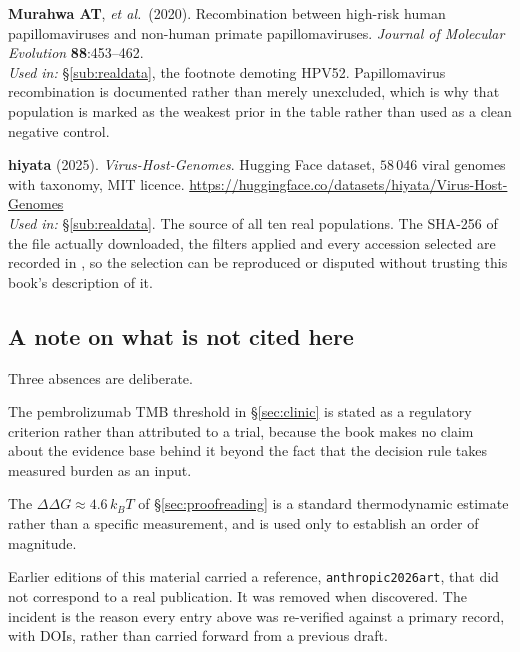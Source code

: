 \begin{refs}
\item \textbf{Murahwa AT}, \emph{et al.}\ (2020). Recombination between
high-risk human papillomaviruses and non-human primate papillomaviruses.
\emph{Journal of Molecular Evolution} \textbf{88}:453--462.
\\[0.15em]
\emph{Used in:} §\ref{sub:realdata}, the footnote demoting HPV52. Papillomavirus
recombination is documented rather than merely unexcluded, which is why that
population is marked as the weakest prior in the table rather than used as a
clean negative control.

\item \textbf{hiyata} (2025). \emph{Virus-Host-Genomes}. Hugging Face dataset,
$58\,046$ viral genomes with taxonomy, MIT licence.
\url{https://huggingface.co/datasets/hiyata/Virus-Host-Genomes}
\\[0.15em]
\emph{Used in:} §\ref{sub:realdata}. The source of all ten real populations. The
SHA-256 of the file actually downloaded, the filters applied and every accession
selected are recorded in
, so the selection can
be reproduced or disputed without trusting this book's description of it.
\end{refs}

\subsection*{A note on what is not cited here}

Three absences are deliberate.

The pembrolizumab TMB threshold in §\ref{sec:clinic} is stated as a regulatory
criterion rather than attributed to a trial, because the book makes no claim
about the evidence base behind it beyond the fact that the decision rule takes
measured burden as an input.

The $\Delta\Delta G \approx 4.6\,k_BT$ of §\ref{sec:proofreading} is a standard
thermodynamic estimate rather than a specific measurement, and is used only to
establish an order of magnitude.

Earlier editions of this material carried a reference, \texttt{anthropic2026art},
that did not correspond to a real publication. It was removed when discovered.
The incident is the reason every entry above was re-verified against a primary
record, with DOIs, rather than carried forward from a previous draft.
